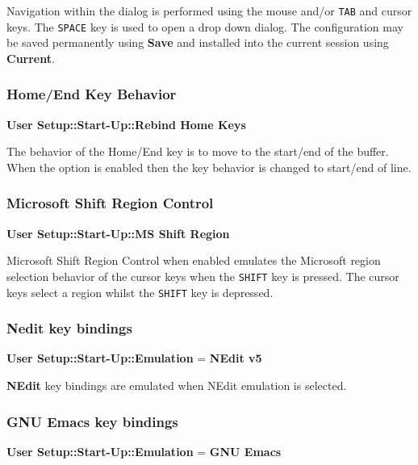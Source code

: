 \documentclass[11pt,a4paper,pdftex]{article}
\begin{document}
    Navigation within the dialog is performed using the mouse and/or
    \texttt{TAB} and cursor keys. The \texttt{SPACE} key is used to open a
    drop down dialog. The configuration may be saved permanently using
    \textbf{Save} and installed into the current session using
    \textbf{Current}.

\subsubsection{Home/End Key Behavior}

    \textbf{User Setup::Start-Up::Rebind Home Keys}

    The behavior of the Home/End key is to move to the start/end of the
    buffer. When the option is enabled then the key behavior is changed to
    start/end of line.

\subsubsection{Microsoft Shift Region Control}

    \textbf{User Setup::Start-Up::MS Shift Region}

    Microsoft Shift Region Control when enabled emulates the Microsoft region
    selection behavior of the cursor keys when the \texttt{SHIFT} key is
    pressed. The cursor keys select a region whilst the \texttt{SHIFT} key is
    depressed.

\subsubsection{Nedit key bindings}

    \textbf{User Setup::Start-Up::Emulation} = \textbf{NEdit v5}

    \textbf{NEdit} key bindings are emulated when NEdit emulation is selected.

\subsubsection{GNU Emacs key bindings}

    \textbf{User Setup::Start-Up::Emulation} = \textbf{GNU Emacs}
\end{document}
